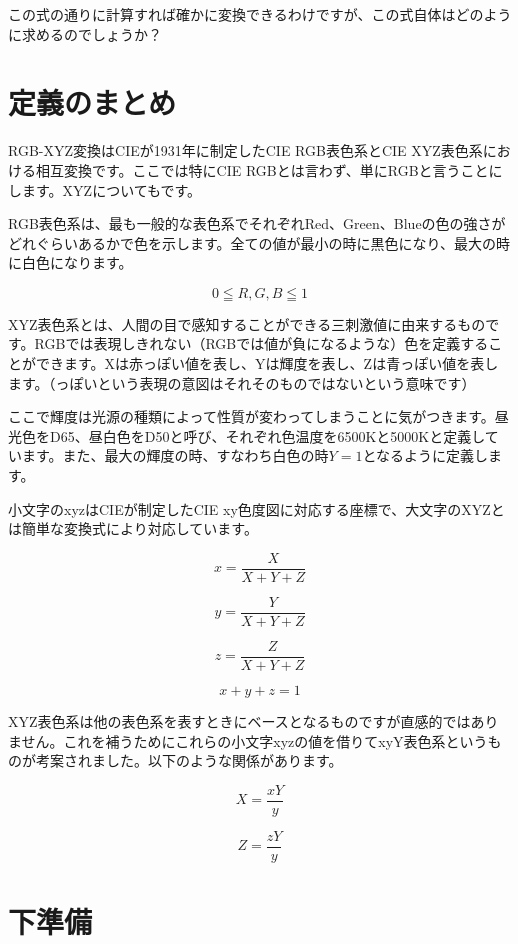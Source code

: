 \documentclass[12pt]{jsarticle}
\begin{document}
この式の通りに計算すれば確かに変換できるわけですが、この式自体はどのように求めるのでしょうか？

\section{定義のまとめ}

RGB-XYZ変換はCIEが1931年に制定したCIE RGB表色系とCIE XYZ表色系における相互変換です。ここでは特にCIE RGBとは言わず、単にRGBと言うことにします。XYZについてもです。

RGB表色系は、最も一般的な表色系でそれぞれRed、Green、Blueの色の強さがどれぐらいあるかで色を示します。全ての値が最小の時に黒色になり、最大の時に白色になります。

\[ 0 \leqq R,G,B \leqq 1 \]

XYZ表色系とは、人間の目で感知することができる三刺激値に由来するものです。RGBでは表現しきれない（RGBでは値が負になるような）色を定義することができます。Xは赤っぽい値を表し、Yは輝度を表し、Zは青っぽい値を表します。（っぽいという表現の意図はそれそのものではないという意味です）

ここで輝度は光源の種類によって性質が変わってしまうことに気がつきます。昼光色をD65、昼白色をD50と呼び、それぞれ色温度を6500Kと5000Kと定義しています。また、最大の輝度の時、すなわち白色の時$Y=1$となるように定義します。

小文字のxyzはCIEが制定したCIE xy色度図に対応する座標で、大文字のXYZとは簡単な変換式により対応しています。

\[
x = \frac{X}{X + Y + Z}
\]

\[
y = \frac{Y}{X + Y + Z}
\]

\[
z = \frac{Z}{X + Y + Z}
\]

\[
x + y + z = 1
\]

XYZ表色系は他の表色系を表すときにベースとなるものですが直感的ではありません。これを補うためにこれらの小文字xyzの値を借りてxyY表色系というものが考案されました。以下のような関係があります。

\begin{equation}
X = \frac{xY}{y} \label{eq:X_xyY}
\end{equation}

\begin{equation}
Z = \frac{zY}{y} \label{eq:Z_xyY}
\end{equation}

\section{下準備}
\end{document}
